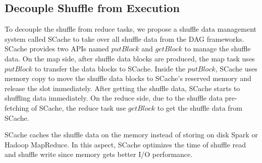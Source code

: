 \subsection{Decouple Shuffle from Execution}
{\color{black}
To decouple the shuffle from reduce tasks, we propose a shuffle data management system called SCache to take over all shuffle data from the DAG frameworks.
SCache provides two APIs named $putBlock$ and $getBlock$ to manage the shuffle data.
On the map side, after shuffle data blocks are produced, the map task uses $putBlock$ to transfer the data blocks to SCache.
Inside the $putBlock$, SCache uses memory copy to move the shuffle data blocks to SCache's reserved memory and release the slot immediately.
After getting the shuffle data, SCache starts to shuffling data immediately.
On the reduce side, due to the shuffle data pre-fetching of SCache, the reduce task use $getBlock$ to get the shuffle data from SCache.

SCache caches the shuffle data on the memory instead of storing on disk  Spark or Hadoop MapReduce.
In this aspect, SCache optimizes the time of shuffle read and shuffle write since memory gets better I/O performance.
}


